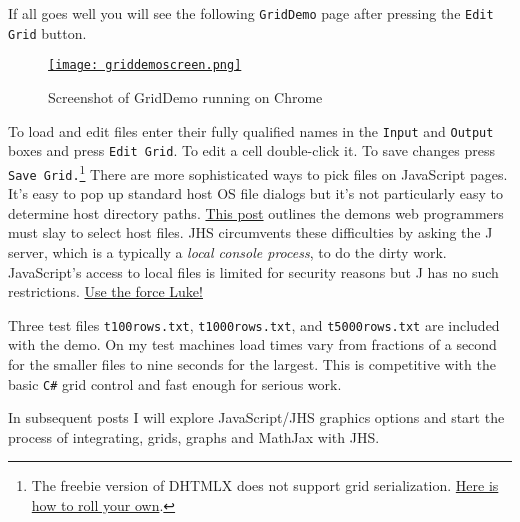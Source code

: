 \noindent If all goes well you will see the following \texttt{GridDemo} page after
pressing the \texttt{Edit Grid} button.



\captionsetup[figure]{labelformat=empty}
\begin{figure}[htbp]
\centering
\href{http://bakerjd99.wordpress.com/2012/12/03/jhs-with-the-dhtmlx-grid/griddemoscreen/}{\texttt{[image: griddemoscreen.png]}}
\caption{Screenshot of GridDemo running on Chrome}
\label{fig:3467X0}
\end{figure}


To load and edit files enter their fully qualified names in the
\texttt{Input} and \texttt{Output} boxes and press \texttt{Edit Grid}.
To edit a cell double-click it. To save changes press
\texttt{Save Grid.}\footnote{
 The freebie version of DHTMLX does not support grid serialization.
  \href{http://bakerjd99.wordpress.com/2012/12/04/more-about-jhs-with-dhtmlx-the-grid/}{Here
  is how to roll your own}.
} There are more
sophisticated ways to pick files on JavaScript pages. It's easy to pop
up standard host OS file dialogs but it's not particularly easy to
determine host directory paths.
\href{http://robertnyman.com/2010/12/16/utilizing-the-html5-file-api-to-choose-upload-preview-and-see-progress-for-multiple-files/}{This
post} outlines the demons web programmers must slay to select host
files. JHS circumvents these difficulties by asking the J server, which
is a typically a \emph{local console process}, to do the dirty work.
JavaScript's access to local files is limited for security reasons but J
has no such restrictions.
\href{http://www.youtube.com/watch?v=-fSj6LxsZes}{Use the force Luke!}

Three test files \texttt{t100rows.txt}, \texttt{t1000rows.txt}, and
\texttt{t5000rows.txt} are included with the demo. On my test machines
load times vary from fractions of a second for the smaller files to nine
seconds for the largest. This is competitive with the basic \texttt{C\#}
grid control and fast enough for serious work.

In subsequent posts I will explore JavaScript/JHS graphics options and
start the process of integrating, grids, graphs and MathJax with JHS.





%